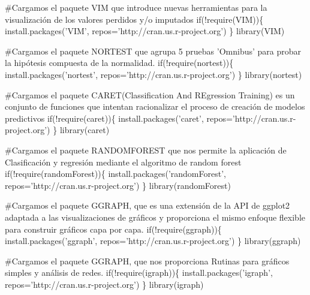 \documentclass[
]{article}
\newenvironment{Shaded}{\begin{snugshade}}{\end{snugshade}}
\newcommand{\CommentTok}[1]{\textcolor[rgb]{0.50,0.62,0.50}{#1}}
\newcommand{\ControlFlowTok}[1]{\textcolor[rgb]{0.94,0.87,0.69}{#1}}
\newcommand{\DataTypeTok}[1]{\textcolor[rgb]{0.87,0.87,0.75}{#1}}
\newcommand{\KeywordTok}[1]{\textcolor[rgb]{0.94,0.87,0.69}{#1}}
\newcommand{\NormalTok}[1]{\textcolor[rgb]{0.80,0.80,0.80}{#1}}
\newcommand{\OperatorTok}[1]{\textcolor[rgb]{0.94,0.94,0.82}{#1}}
\newcommand{\StringTok}[1]{\textcolor[rgb]{0.80,0.58,0.58}{#1}}
\begin{document}
\begin{Shaded}
\begin{Highlighting}[]
\CommentTok{#Cargamos el paquete VIM que introduce nuevas herramientas para la visualización de los valores perdidos y/o imputados}
\ControlFlowTok{if}\NormalTok{(}\OperatorTok{!}\KeywordTok{require}\NormalTok{(VIM))\{}
    \KeywordTok{install.packages}\NormalTok{(}\StringTok{'VIM'}\NormalTok{, }\DataTypeTok{repos=}\StringTok{'http://cran.us.r-project.org'}\NormalTok{)}
\NormalTok{\}}
\KeywordTok{library}\NormalTok{(VIM)}

\CommentTok{#Cargamos el paquete NORTEST que agrupa 5 pruebas 'Omnibus' para probar la hipótesis compuesta de la normalidad.}
\ControlFlowTok{if}\NormalTok{(}\OperatorTok{!}\KeywordTok{require}\NormalTok{(nortest))\{}
    \KeywordTok{install.packages}\NormalTok{(}\StringTok{'nortest'}\NormalTok{, }\DataTypeTok{repos=}\StringTok{'http://cran.us.r-project.org'}\NormalTok{)}
\NormalTok{\}}
\KeywordTok{library}\NormalTok{(nortest)}

\CommentTok{#Cargamos el paquete CARET(Classification And REgression Training) es un conjunto de funciones que intentan racionalizar el proceso de creación de modelos predictivos}
\ControlFlowTok{if}\NormalTok{(}\OperatorTok{!}\KeywordTok{require}\NormalTok{(caret))\{}
    \KeywordTok{install.packages}\NormalTok{(}\StringTok{'caret'}\NormalTok{, }\DataTypeTok{repos=}\StringTok{'http://cran.us.r-project.org'}\NormalTok{)}
\NormalTok{\}}
\KeywordTok{library}\NormalTok{(caret)}

\CommentTok{#Cargamos el paquete RANDOMFOREST que nos permite la aplicación de Clasificación y regresión mediante el algoritmo de random forest}
\ControlFlowTok{if}\NormalTok{(}\OperatorTok{!}\KeywordTok{require}\NormalTok{(randomForest))\{}
    \KeywordTok{install.packages}\NormalTok{(}\StringTok{'randomForest'}\NormalTok{, }\DataTypeTok{repos=}\StringTok{'http://cran.us.r-project.org'}\NormalTok{)}
\NormalTok{\}}
\KeywordTok{library}\NormalTok{(randomForest)}

\CommentTok{#Cargamos el paquete GGRAPH, que es una extensión de la API de ggplot2 adaptada a las visualizaciones de gráficos y proporciona el mismo enfoque flexible para construir gráficos capa por capa.}
\ControlFlowTok{if}\NormalTok{(}\OperatorTok{!}\KeywordTok{require}\NormalTok{(ggraph))\{}
    \KeywordTok{install.packages}\NormalTok{(}\StringTok{'ggraph'}\NormalTok{, }\DataTypeTok{repos=}\StringTok{'http://cran.us.r-project.org'}\NormalTok{)}
\NormalTok{\}}
\KeywordTok{library}\NormalTok{(ggraph)}

\CommentTok{#Cargamos el paquete GGRAPH, que nos proporciona Rutinas para gráficos simples y análisis de redes.}
\ControlFlowTok{if}\NormalTok{(}\OperatorTok{!}\KeywordTok{require}\NormalTok{(igraph))\{}
    \KeywordTok{install.packages}\NormalTok{(}\StringTok{'igraph'}\NormalTok{, }\DataTypeTok{repos=}\StringTok{'http://cran.us.r-project.org'}\NormalTok{)}
\NormalTok{\}}
\KeywordTok{library}\NormalTok{(igraph)}
\end{Highlighting}
\end{Shaded}
\end{document}
